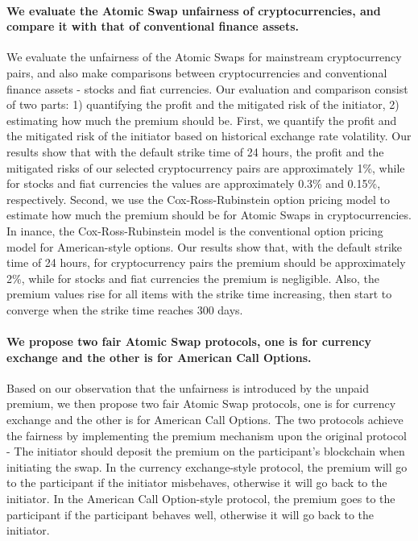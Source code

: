 \paragraph{We evaluate the Atomic Swap unfairness of cryptocurrencies, and compare it with that of conventional finance assets.}
We evaluate the unfairness of the Atomic Swaps for mainstream cryptocurrency pairs, and also make comparisons between cryptocurrencies and conventional finance assets - stocks and fiat currencies.
Our evaluation and comparison consist of two parts: 1) quantifying the profit and the mitigated risk of the initiator, 2) estimating how much the premium should be.
First, we quantify the profit and the mitigated risk of the initiator based on historical exchange rate volatility.
Our results show that with the default strike time of 24 hours, the profit and the mitigated risks of our selected cryptocurrency pairs are approximately 1\%, while for stocks and fiat currencies the values are approximately 0.3\% and 0.15\%, respectively.
Second, we use the Cox-Ross-Rubinstein option pricing model to estimate how much the premium should be for Atomic Swaps in cryptocurrencies.
In inance, the Cox-Ross-Rubinstein model is the conventional option pricing model for American-style options.
Our results show that, with the default strike time of 24 hours, for cryptocurrency pairs the premium should be approximately 2\%, while for stocks and fiat currencies the premium is negligible.
Also, the premium values rise for all items with the strike time increasing, then start to converge when the strike time reaches 300 days.

\paragraph{We propose two fair Atomic Swap protocols, one is for currency exchange and the other is for American Call Options.}
Based on our observation that the unfairness is introduced by the unpaid premium,
we then propose two fair Atomic Swap protocols, one is for currency exchange and the other is for American Call Options.
The two protocols achieve the fairness by implementing the premium mechanism upon the original protocol - The initiator should deposit the premium on the participant's blockchain when initiating the swap.
In the currency exchange-style protocol, the premium will go to the participant if the initiator misbehaves, otherwise it will go back to the initiator.
In the American Call Option-style protocol, the premium goes to the participant if the participant behaves well, otherwise it will go back to the initiator.

